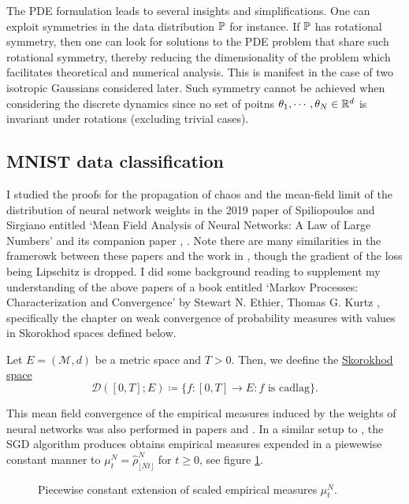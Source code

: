 \documentclass{article}
\begin{document}
The PDE formulation leads to several insights and simplifications. One can exploit symmetries in the data distribution $ \mathbb{P}$ for instance. If $ \mathbb{P}$ has rotational symmetry, then one can look for solutions to the PDE problem that share such rotational symmetry, thereby reducing the dimensionality of the problem which facilitates theoretical and numerical analysis. This is manifest in the case of two isotropic Gaussians considered later. Such symmetry cannot be achieved when considering the discrete dynamics since no set of poitns $ \mathbf{\theta}_{1}, \cdots, \mathbf{\theta}_{N}\in \mathbb{R}^{d}$ is invariant under rotations (excluding trivial cases).

\subsection{MNIST data classification}\label{sec: MNIST classification}

I studied the proofs for the propagation of chaos and the mean-field limit of the distribution of neural network weights in the 2019 paper of Spiliopoulos and Sirgiano entitled ‘Mean Field Analysis of Neural Networks: A Law of Large Numbers’ and its companion paper \cite{sirignano2019meanfieldanalysislln}, \cite{sirignano2019meanfieldanalysisclt}. Note there are many similarities in the framerowk between these papers and the work in \cite{Mei_2018}, though the gradient of the loss being Lipschitz is dropped. I did some background reading to supplement my understanding of the above papers of a book entitled ‘Markov Processes: Characterization and Convergence’ by Stewart N. Ethier, Thomas G. Kurtz \cite{ethier2009markov}, specifically the chapter on weak convergence of probability measures with values in Skorokhod spaces defined below.

\begin{boxdef}\label{def: skorokhod}
	Let $  E = (\mathcal{M}, d)$ be a metric space and $ T>0$. Then, we deefine the \underline{Skorokhod space} 
\begin{equation}
	\mathcal{D}([0,T]; E) \coloneqq \{f:[0,T]\to E: f \text{ is cadlag}\}.
\end{equation}

\end{boxdef}

This mean field convergence of the empirical measures induced by the weights of neural networks was also performed in papers \cite{sirignano2019meanfieldanalysisclt} and \cite{sirignano2019meanfieldanalysislln}. In a similar setup to \cite{Mei_2018}, the SGD algorithm produces obtains empirical measures expended in a piewewise constant manner to $\mu^{N}_{t} = \hat{\rho}^{N}_{\lfloor Nt \rfloor}$ for $ t\geq 0$, see figure \ref{fig: piecewise constant extension of function}. 
\begin{figure}[H]
    \centering
    
    \caption{Piecewise constant extension of scaled empirical measures $ \mu^{N}_{t}$.}
    \label{fig: piecewise constant extension of function}
\end{figure}
\end{document}
